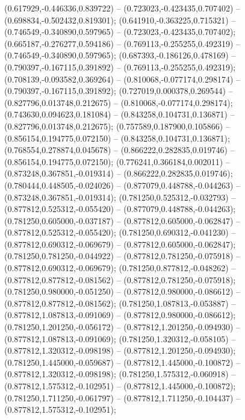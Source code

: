  (0.617929,-0.446336,0.839722) -- (0.723023,-0.423435,0.707402) -- (0.698834,-0.502432,0.819301);
 (0.641910,-0.363225,0.715321) -- (0.746549,-0.340890,0.597965) -- (0.723023,-0.423435,0.707402);
 (0.665187,-0.276277,0.594186) -- (0.769113,-0.255255,0.492319) -- (0.746549,-0.340890,0.597965);
 (0.687393,-0.186126,0.478169) -- (0.790397,-0.167115,0.391892) -- (0.769113,-0.255255,0.492319);
 (0.708139,-0.093582,0.369264) -- (0.810068,-0.077174,0.298174) -- (0.790397,-0.167115,0.391892);
 (0.727019,0.000378,0.269544) -- (0.827796,0.013748,0.212675) -- (0.810068,-0.077174,0.298174);
 (0.743630,0.094623,0.181084) -- (0.843258,0.104731,0.136871) -- (0.827796,0.013748,0.212675);
 (0.757589,0.187900,0.105866) -- (0.856154,0.194775,0.072150) -- (0.843258,0.104731,0.136871);
 (0.768554,0.278874,0.045678) -- (0.866222,0.282835,0.019746) -- (0.856154,0.194775,0.072150);
 (0.776241,0.366184,0.002011) -- (0.873248,0.367851,-0.019314) -- (0.866222,0.282835,0.019746);
 (0.780444,0.448505,-0.024026) -- (0.877079,0.448788,-0.044263) -- (0.873248,0.367851,-0.019314);
 (0.781250,0.525312,-0.032793) -- (0.877812,0.525312,-0.055420) -- (0.877079,0.448788,-0.044263);
 (0.781250,0.605000,-0.037187) -- (0.877812,0.605000,-0.062847) -- (0.877812,0.525312,-0.055420);
 (0.781250,0.690312,-0.041230) -- (0.877812,0.690312,-0.069679) -- (0.877812,0.605000,-0.062847);
 (0.781250,0.781250,-0.044922) -- (0.877812,0.781250,-0.075918) -- (0.877812,0.690312,-0.069679);
 (0.781250,0.877812,-0.048262) -- (0.877812,0.877812,-0.081562) -- (0.877812,0.781250,-0.075918);
 (0.781250,0.980000,-0.051250) -- (0.877812,0.980000,-0.086612) -- (0.877812,0.877812,-0.081562);
 (0.781250,1.087813,-0.053887) -- (0.877812,1.087813,-0.091069) -- (0.877812,0.980000,-0.086612);
 (0.781250,1.201250,-0.056172) -- (0.877812,1.201250,-0.094930) -- (0.877812,1.087813,-0.091069);
 (0.781250,1.320312,-0.058105) -- (0.877812,1.320312,-0.098198) -- (0.877812,1.201250,-0.094930);
 (0.781250,1.445000,-0.059687) -- (0.877812,1.445000,-0.100872) -- (0.877812,1.320312,-0.098198);
 (0.781250,1.575312,-0.060918) -- (0.877812,1.575312,-0.102951) -- (0.877812,1.445000,-0.100872);
 (0.781250,1.711250,-0.061797) -- (0.877812,1.711250,-0.104437) -- (0.877812,1.575312,-0.102951);
